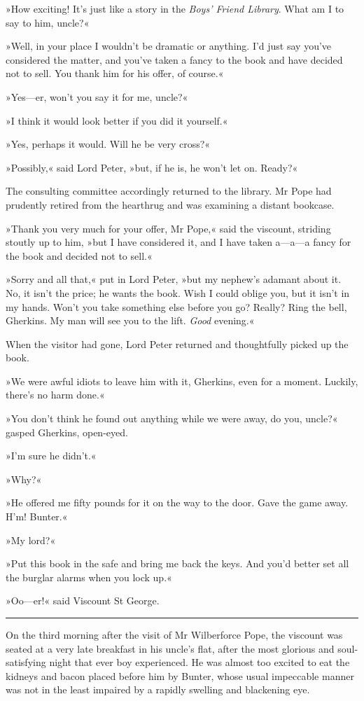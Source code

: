 »How exciting! It's just like a story in the \textit{Boys' Friend Library}. What am I to say to him, uncle?«

»Well, in your place I wouldn't be dramatic or anything. I'd just say you've considered the matter, and you've taken a fancy to the book and have decided not to sell. You thank him for his offer, of course.«

»Yes—er, won't you say it for me, uncle?«

»I think it would look better if you did it yourself.«

»Yes, perhaps it would. Will he be very cross?«

»Possibly,« said Lord Peter, »but, if he is, he won't let on. Ready?«

The consulting committee accordingly returned to the library. Mr Pope had prudently retired from the hearthrug and was examining a distant bookcase.

»Thank you very much for your offer, Mr Pope,« said the viscount, striding stoutly up to him, »but I have considered it, and I have taken a—a—a fancy for the book and decided not to sell.«

»Sorry and all that,« put in Lord Peter, »but my nephew's adamant about it. No, it isn't the price; he wants the book. Wish I could oblige you, but it isn't in my hands. Won't you take something else before you go? Really? Ring the bell, Gherkins. My man will see you to the lift. \textit{Good} evening.«

When the visitor had gone, Lord Peter returned and thoughtfully picked up the book.

»We were awful idiots to leave him with it, Gherkins, even for a moment. Luckily, there's no harm done.«

»You don't think he found out anything while we were away, do you, uncle?« gasped Gherkins, open-eyed.

»I'm sure he didn't.«

»Why?«

»He offered me fifty pounds for it on the way to the door. Gave the game away. H'm! Bunter.«

»My lord?«

»Put this book in the safe and bring me back the keys. And you'd better set all the burglar alarms when you lock up.«

»Oo—er!« said Viscount St George.

\noindent\hfil\rule{0.5\textwidth}{.4pt}\hfil 

On the third morning after the visit of Mr Wilberforce Pope, the viscount was seated at a very late breakfast in his uncle's flat, after the most glorious and soul-satisfying night that ever boy experienced. He was almost too excited to eat the kidneys and bacon placed before him by Bunter, whose usual impeccable manner was not in the least impaired by a rapidly swelling and blackening eye.

